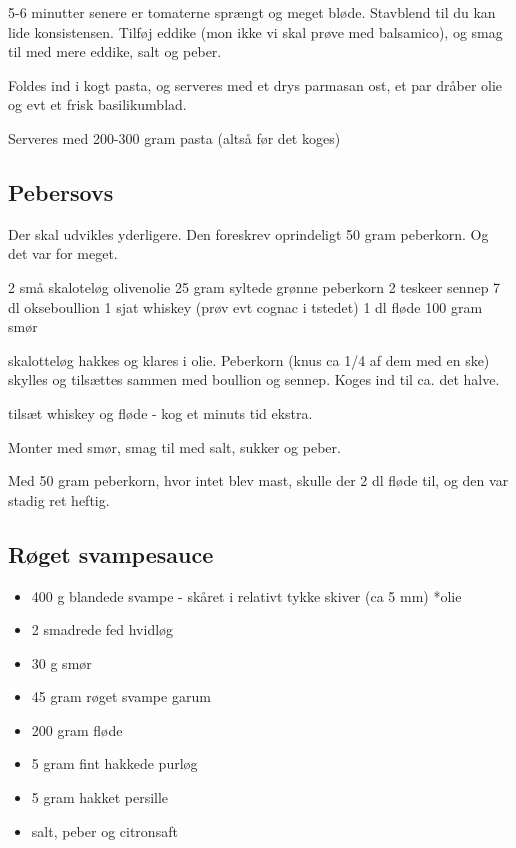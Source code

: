 \documentclass[
]{book}
\providecommand{\tightlist}{%
  \setlength{\itemsep}{0pt}\setlength{\parskip}{0pt}}
\begin{document}
5-6 minutter senere er tomaterne sprængt og meget bløde. Stavblend til du kan lide konsistensen. Tilføj
eddike (mon ikke vi skal prøve med balsamico), og smag til med mere eddike, salt og peber.

Foldes ind i kogt pasta, og serveres med et drys parmasan ost, et par dråber olie og evt et frisk basilikumblad.

Serveres med 200-300 gram pasta (altså før det koges)

\hypertarget{pebersovs}{%
\subsection{Pebersovs}\label{pebersovs}}

Der skal udvikles yderligere.
Den foreskrev oprindeligt 50 gram peberkorn. Og det var for meget.

2 små skaloteløg
olivenolie
25 gram syltede grønne peberkorn
2 teskeer sennep
7 dl okseboullion
1 sjat whiskey (prøv evt cognac i tstedet)
1 dl fløde
100 gram smør

skalotteløg hakkes og klares i olie.
Peberkorn (knus ca 1/4 af dem med en ske) skylles og tilsættes
sammen med boullion og sennep. Koges ind til ca. det halve.

tilsæt whiskey og fløde - kog et minuts tid ekstra.

Monter med smør, smag til med salt, sukker og peber.

Med 50 gram peberkorn, hvor intet blev mast, skulle der
2 dl fløde til, og den var stadig ret heftig.

\hypertarget{ruxf8get-svampesauce}{%
\subsection{Røget svampesauce}\label{ruxf8get-svampesauce}}

\begin{itemize}
\tightlist
\item
  400 g blandede svampe - skåret i relativt tykke skiver (ca 5 mm)
  *olie
\item
  2 smadrede fed hvidløg
\item
  30 g smør
\item
  45 gram røget svampe garum
\item
  200 gram fløde
\item
  5 gram fint hakkede purløg
\item
  5 gram hakket persille
\item
  salt, peber og citronsaft
\end{itemize}
\end{document}
